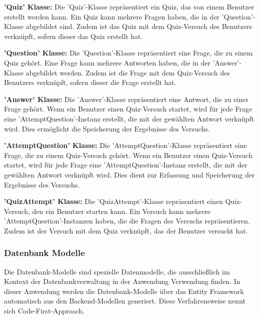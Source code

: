 \noindent\textbf{'Quiz' Klasse:} Die 'Quiz'-Klasse repräsentiert ein Quiz, das von einem Benutzer erstellt werden kann. 
Ein Quiz kann mehrere Fragen haben, die in der 'Question'-Klasse abgebildet sind. Zudem ist das Quiz mit dem Quiz-Versuch des Benutzers 
verknüpft, sofern dieser das Quiz erstellt hat. \newline

\noindent\textbf{'Question' Klasse:} Die 'Question'-Klasse repräsentiert eine Frage, die zu einem Quiz gehört. 
Eine Frage kann mehrere Antworten haben, die in der 'Answer'-Klasse abgebildet werden. Zudem ist die Frage mit dem Quiz-Versuch des 
Benutzers verknüpft, sofern dieser die Frage erstellt hat. \newline

\noindent\textbf{'Answer' Klasse:} Die 'Answer'-Klasse repräsentiert eine Antwort, die zu einer Frage gehört. 
Wenn ein Benutzer einen Quiz-Versuch startet, wird für jede Frage eine 'AttemptQuestion'-Instanz erstellt, die mit der 
gewählten Antwort verknüpft wird. Dies ermöglicht die Speicherung der Ergebnisse des Versuchs. \newline

\noindent\textbf{'AttemptQuestion' Klasse:} Die 'AttemptQuestion'-Klasse repräsentiert eine Frage, die zu einem Quiz-Versuch gehört. 
Wenn ein Benutzer einen Quiz-Versuch startet, wird für jede Frage eine 'AttemptQuestion'-Instanz erstellt, die mit der gewählten 
Antwort verknüpft wird. Dies dient zur Erfassung und Speicherung der Ergebnisse des Versuchs. \newline

\noindent\textbf{'QuizAttempt' Klasse:} Die 'QuizAttempt'-Klasse repräsentiert einen Quiz-Versuch, den ein Benutzer starten kann. 
Ein Versuch kann mehrere 'AttemptQuestion'-Instanzen haben, die die Fragen des Versuchs repräsentieren. Zudem ist der 
Versuch mit dem Quiz verknüpft, das der Benutzer versucht hat. \newline

\subsubsection{Datenbank Modelle}

Die Datenbank-Modelle sind spezielle Datenmodelle, die ausschließlich im Kontext der Datenbankverwaltung in der Anwendung Verwendung finden.
In dieser Anwendung werden die Datenbank-Modelle über das Entity Framework automatisch aus den Backend-Modellen generiert. 
Diese Verfahrensweise nennt sich Code-First-Approach. \newline

